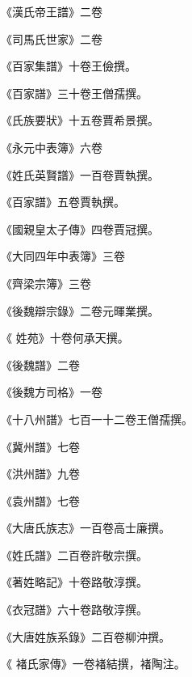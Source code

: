 \begin{pinyinscope}
 《漢氏帝王譜》二卷



 《司馬氏世家》二卷



 《百家集譜》十卷王儉撰。



 《百家譜》三十卷王僧孺撰。



 《氏族要狀》十五卷賈希景撰。



 《永元中表簿》六卷



 《姓氏英賢譜》一百卷賈執撰。



 《百家譜》五卷賈執撰。



 《國親皇太子傳》四卷賈冠撰。



 《大同四年中表簿》三卷



 《齊梁宗簿》三卷



 《後魏辯宗錄》二卷元暉業撰。



 《
 姓苑》十卷何承天撰。



 《後魏譜》二卷



 《後魏方司格》一卷



 《十八州譜》七百一十二卷王僧孺撰。



 《冀州譜》七卷



 《洪州譜》九卷



 《袁州譜》七卷



 《大唐氏族志》一百卷高士廉撰。



 《姓氏譜》二百卷許敬宗撰。



 《著姓略記》十卷路敬淳撰。



 《衣冠譜》六十卷路敬淳撰。



 《大唐姓族系錄》二百卷柳沖撰。



 《
 褚氏家傳》一卷褚結撰，褚陶注。




\end{pinyinscope}
